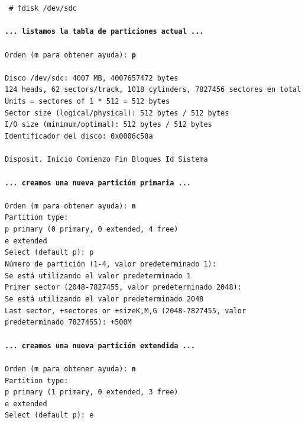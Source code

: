 \documentclass[12pt]{article}
\begin{document}
{\tt
\# fdisk /dev/sdc\\
\\
\textbf{... listamos la tabla de particiones actual ...}\\
\\
Orden (m para obtener ayuda):  {\bf p}\\
\\
Disco /dev/sdc: 4007 MB, 4007657472 bytes\\
124 heads, 62 sectors/track, 1018 cylinders, 7827456 sectores en total\\
Units = sectores of 1 * 512 = 512 bytes\\
Sector size (logical/physical): 512 bytes / 512 bytes\\
I/O size (minimum/optimal): 512 bytes / 512 bytes\\
Identificador del disco: 0x0006c58a\\
\\
Disposit. Inicio    Comienzo      Fin      Bloques  Id  Sistema\\
\\
\textbf{... creamos una nueva partición primaria ...}\\
\\
Orden (m para obtener ayuda):  {\bf n}\\
Partition type:\\
   p   primary (0 primary, 0 extended, 4 free)\\
   e   extended\\
Select (default p): p\\
Número de partición (1-4, valor predeterminado 1): \\
Se está utilizando el valor predeterminado 1\\
Primer sector (2048-7827455, valor predeterminado 2048): \\
Se está utilizando el valor predeterminado 2048\\
Last sector, +sectores or +size{K,M,G} (2048-7827455, valor predeterminado 7827455): +500M\\
\\
\textbf{... creamos una nueva partición extendida ...}\\
\\
Orden (m para obtener ayuda):  {\bf n}\\
Partition type:\\
   p   primary (1 primary, 0 extended, 3 free)\\
   e   extended\\
Select (default p): e\\
}
\end{document}
